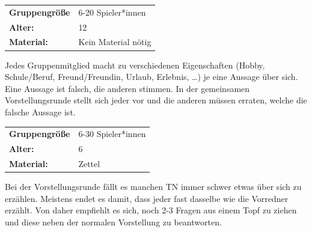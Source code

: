 \begin{table}[H]
\begin{tabular}{>{\bfseries}lp{8cm}}
   Gruppengröße   & 6-20 Spieler*innen\\
    Alter: & 12 \\
    Material: & Kein Material nötig \\
\end{tabular}
\end{table} 
Jedes Gruppenmitglied macht zu verschiedenen Eigenschaften (Hobby, Schule/Beruf, Freund/Freundin, Urlaub, Erlebnis, …) je eine Aussage über sich. Eine Aussage ist falsch, die anderen stimmen. In der gemeinsamen Vorstellungsrunde stellt sich jeder vor und die anderen müssen erraten, welche die falsche Aussage ist.  \\


\newpage
\begin{table}[H]
\begin{tabular}{>{\bfseries}lp{8cm}}
   Gruppengröße   & 6-30 Spieler*innen\\
    Alter: & 6 \\
    Material: & Zettel \\
\end{tabular}
\end{table} 
Bei der Vorstellungsrunde fällt es manchen TN immer schwer etwas über sich zu erzählen. Meistens endet es damit, dass jeder fast dasselbe wie die Vorredner erzählt. Von daher empfiehlt es sich, noch 2-3 Fragen aus einem Topf zu ziehen und diese neben der normalen Vorstellung zu beantworten. \\



